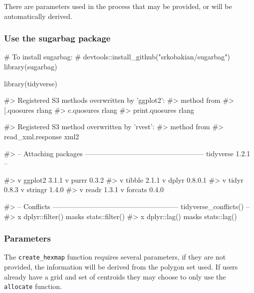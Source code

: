 There are parameters used in the process that may be provided, or will
be automatically derived.

\hypertarget{use-the-sugarbag-package}{%
\subsubsection{Use the sugarbag
package}\label{use-the-sugarbag-package}}

\begin{Schunk}
\begin{Sinput}
# To install sugarbag:
# devtools::install_github("srkobakian/sugarbag")
library(sugarbag)

library(tidyverse)
\end{Sinput}
\begin{Soutput}
#> Registered S3 methods overwritten by 'ggplot2':
#>   method         from 
#>   [.quosures     rlang
#>   c.quosures     rlang
#>   print.quosures rlang
\end{Soutput}
\begin{Soutput}
#> Registered S3 method overwritten by 'rvest':
#>   method            from
#>   read_xml.response xml2
\end{Soutput}
\begin{Soutput}
#> -- Attaching packages --------------------------------------------------- tidyverse 1.2.1 --
\end{Soutput}
\begin{Soutput}
#> v ggplot2 3.1.1       v purrr   0.3.2  
#> v tibble  2.1.1       v dplyr   0.8.0.1
#> v tidyr   0.8.3       v stringr 1.4.0  
#> v readr   1.3.1       v forcats 0.4.0
\end{Soutput}
\begin{Soutput}
#> -- Conflicts ------------------------------------------------------ tidyverse_conflicts() --
#> x dplyr::filter() masks stats::filter()
#> x dplyr::lag()    masks stats::lag()
\end{Soutput}
\end{Schunk}

\hypertarget{parameters}{%
\subsubsection{Parameters}\label{parameters}}

The \texttt{create\_hexmap} function requires several parameters, if
they are not provided, the information will be derived from the polygon
set used. If users already have a grid and set of centroids they may
choose to only use the \texttt{allocate} function.

